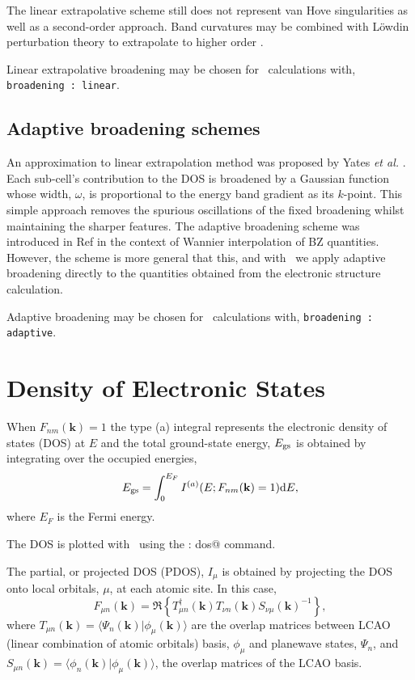 \documentclass[a4paper,11pt,twoside]{book}
\newcommand{\kbf}{\mathbf{k}}
\renewcommand{\d}{\mathrm{d}}
\begin{document}
The linear extrapolative scheme still does not represent van Hove singularities as well as a second-order approach.
%
Band curvatures may be combined with L\"owdin perturbation theory to extrapolate to higher order \cite{pickard:PRB:1999,pickard:PRB:2000}.

Linear extrapolative broadening may be chosen  for \optados\ calculations with, \texttt{broadening : linear}.


\subsection{Adaptive broadening schemes}
An approximation to linear extrapolation method was proposed by Yates \emph{et al.} \cite{yates:PRB:2007}.
%
Each sub-cell's contribution to the DOS is broadened by a Gaussian function whose width, $\omega$, is proportional to the energy band gradient as its $k$-point.
%
This simple approach removes the spurious oscillations of the fixed broadening whilst maintaining the sharper features.
%
The adaptive broadening scheme was introduced in Ref \cite{yates:PRB:2007} in the context of Wannier interpolation of BZ quantities.
%
However, the scheme is more general that this, and with \optados\ we apply adaptive broadening directly to the quantities obtained from the electronic structure calculation.

Adaptive broadening may be chosen  for \optados\ calculations with, \texttt{broadening : adaptive}.



\section{Density of Electronic States}

When $F_{nm}(\kbf)=1$ the type (a) integral represents the electronic density of states (DOS) at $E$ and the total ground-state energy, $E_{\rm gs}$ is obtained by integrating over the occupied energies,
\begin{equation}
E_{\rm gs} = \int^{E_{F}}_0 I^{(a)}( E; F_{nm}(\kbf)=1) \d E,
\end{equation}
where $E_F$ is the Fermi energy.

The DOS is plotted with \optados\ using the \verb@task : dos@ command.

The partial, or projected DOS (PDOS), $I_{\mu}$ is obtained by projecting the DOS onto local orbitals, $\mu$, at each atomic site\cite{segall:MP:1996}.
%
In this case,
\begin{equation}
F_{\mu n}(\kbf)=\Re \left \{  T_{\mu n}^{\dagger}(\kbf) T_{\nu n}(\kbf) S_{\nu \mu}(\kbf)^{-1} \right \},
\end{equation}
where $ T_{\mu n}(\kbf)= \langle \Psi_n(\kbf)|\phi_{\mu}(\kbf)
\rangle$ are the overlap matrices between LCAO (linear combination of
atomic orbitals) basis, $\phi_{\mu}$ and planewave states, $\Psi_n$, and  $ S_{\mu n}(\kbf)=\langle \phi_n(\kbf)|\phi_{\mu}(\kbf) \rangle$, the overlap matrices of the LCAO basis.
\end{document}
